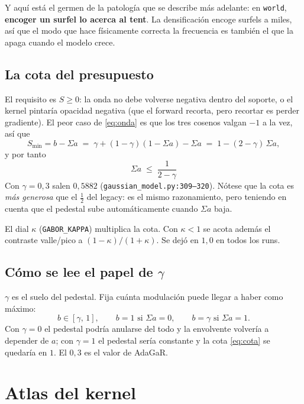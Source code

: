 \documentclass[12pt]{extarticle}
\newcommand{\ssum}{\Sigma a}
\newcommand{\code}[1]{\texttt{#1}}
\begin{document}
Y aquí está el germen de la patología que se describe más adelante: en
\code{world}, \textbf{encoger un surfel lo acerca al tent}. La densificación
encoge surfels a miles, así que el modo que hace físicamente correcta la
frecuencia es también el que la apaga cuando el modelo crece.

\subsection{La cota del presupuesto}

El requisito es $S\ge 0$: la onda no debe volverse negativa dentro del
soporte, o el kernel pintaría opacidad negativa (que el forward recorta, pero
recortar es perder gradiente). El peor caso de \eqref{eq:onda} es que los tres
cosenos valgan $-1$ a la vez, así que
\[
S_{\min} = b - \ssum \;=\; \gamma+(1-\gamma)(1-\ssum)-\ssum
\;=\; 1-(2-\gamma)\,\ssum ,
\]
y por tanto
\begin{equation}
\boxed{\;\ssum \;\le\; \frac{1}{2-\gamma}\;}
\label{eq:cota}
\end{equation}
Con $\gamma=0{,}3$ salen $0{,}5882$ (\code{gaussian\_model.py:309--320}). Nótese
que la cota es \emph{más generosa} que el $\frac12$ del legacy: es el mismo
razonamiento, pero teniendo en cuenta que el pedestal sube automáticamente
cuando $\ssum$ baja.

El dial $\kappa$ (\code{GABOR\_KAPPA}) multiplica la cota. Con $\kappa<1$ se
acota además el contraste valle/pico a $(1-\kappa)/(1+\kappa)$. Se dejó en
$1{,}0$ en todos los runs.

\subsection{Cómo se lee el papel de $\gamma$}

$\gamma$ es el suelo del pedestal. Fija cuánta modulación puede llegar a
haber como máximo:
\[
b\in[\gamma,\,1],\qquad b=1 \text{ si } \ssum=0,\qquad
b=\gamma \text{ si } \ssum=1 .
\]
Con $\gamma=0$ el pedestal podría anularse del todo y la envolvente volvería a
depender de $a$; con $\gamma=1$ el pedestal sería constante y la cota
\eqref{eq:cota} se quedaría en $1$. El $0{,}3$ es el valor de AdaGaR.

\section{Atlas del kernel}
\end{document}
